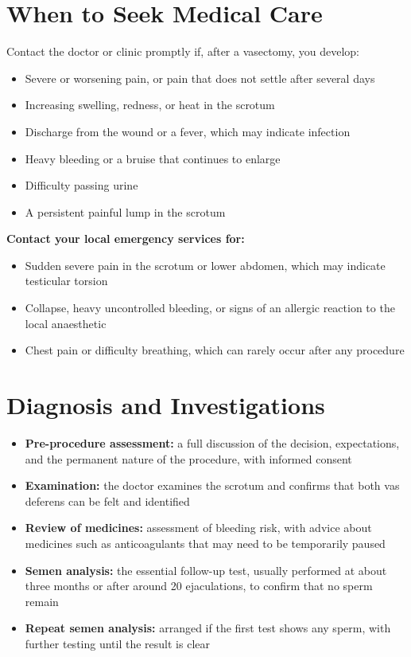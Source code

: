 \section*{When to Seek Medical Care}
Contact the doctor or clinic promptly if, after a vasectomy, you develop:

\begin{itemize}
    \item Severe or worsening pain, or pain that does not settle after several days
    \item Increasing swelling, redness, or heat in the scrotum
    \item Discharge from the wound or a fever, which may indicate infection
    \item Heavy bleeding or a bruise that continues to enlarge
    \item Difficulty passing urine
    \item A persistent painful lump in the scrotum
\end{itemize}

\textbf{Contact your local emergency services for:}
\begin{itemize}
    \item Sudden severe pain in the scrotum or lower abdomen, which may indicate testicular torsion
    \item Collapse, heavy uncontrolled bleeding, or signs of an allergic reaction to the local anaesthetic
    \item Chest pain or difficulty breathing, which can rarely occur after any procedure
\end{itemize}

\section*{Diagnosis and Investigations}
\begin{itemize}
    \item \textbf{Pre-procedure assessment:} a full discussion of the decision, expectations, and the permanent nature of the procedure, with informed consent
    \item \textbf{Examination:} the doctor examines the scrotum and confirms that both vas deferens can be felt and identified
    \item \textbf{Review of medicines:} assessment of bleeding risk, with advice about medicines such as anticoagulants that may need to be temporarily paused
    \item \textbf{Semen analysis:} the essential follow-up test, usually performed at about three months or after around 20 ejaculations, to confirm that no sperm remain
    \item \textbf{Repeat semen analysis:} arranged if the first test shows any sperm, with further testing until the result is clear
\end{itemize}

